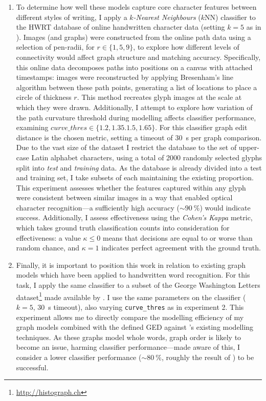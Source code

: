 \documentclass{mpaper}
\begin{document}
\begin{enumerate}
	\item To determine how well these models capture core character features between different styles of writing, I apply a \emph{$k$-Nearest Neighbours} ($k$NN) classifier to the HWRT database of online handwritten character data \cite{HwrtDatabase} (setting $k=5$ as in \cite{Graphs-Handwriting}).
	Images (and graphs) were constructed from the online path data using a selection of pen-radii, for $r \in \{1,5,9\}$, to explore how different levels of connectivity would affect graph structure and matching accuracy.
	Specifically, this online data decomposes paths into positions on a canvas with attached timestamps: images were reconstructed by applying Bresenham's line algorithm between these path points, generating a list of locations to place a circle of thickness $r$.
	This method recreates glyph images at the scale at which they were drawn.
	Additionally, I attempt to explore how variation of the path curvature threshold during modelling affects classifier performance, examining $\mathit{curve\_thres} \in \{1.2, 1.35. 1.5, 1.65\}$.
	For this classifier graph edit distance is the chosen metric, setting a timeout of \SI{30}{\second} per graph comparison.
	Due to the vast size of the dataset I restrict the database to the set of upper-case Latin alphabet characters, using a total of 2000 randomly selected glyphs split into \emph{test} and \emph{training} data.
	As the database is already divided into a test and training set, I take subsets of each maintaining the existing proportion.
	This experiment assesses whether the features captured within any glyph were consistent between similar images in a way that enabled optical character recognition---a sufficiently high accuracy ($\sim\SI{90}{\percent}$) would indicate success.
	Additionally, I assess effectiveness using the \emph{Cohen's Kappa} metric, which takes ground truth classification counts into consideration for effectiveness: a value $\kappa\le0$ means that decisions are equal to or worse than random chance, and $\kappa=1$ indicates perfect agreement with the ground truth.
	
	\item Finally, it is important to position this work in relation to existing graph models which have been applied to handwritten word recognition.
	For this task, I apply the same classifier to a subset of the George Washington Letters dataset\footnote{\url{http://histograph.ch}} made available by \citeauthor{Graphs-Handwriting} \cite{Graphs-Handwriting}.
	I use the same parameters on the classifier ($k=5$, \SI{30}{\second} timeout), also varying \texttt{curve\_thres} as in experiment 2.
	This experiment allows me to directly compare the modelling efficiency of my graph models combined with the defined GED against \citeauthor{Graphs-Handwriting}'s existing modelling techniques.
	As these graphs model whole words, graph order is likely to become an issue, harming classifier performance---made aware of this, I consider a lower classifier performance ($\sim\SI{80}{\percent}$, roughly the result of \citeauthor{Graphs-Handwriting}) to be successful.
\end{enumerate}
\end{document}
